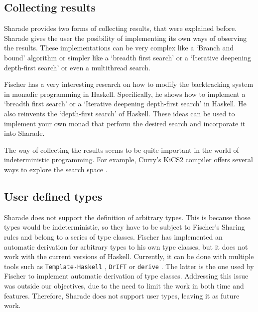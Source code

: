 \documentclass[class=article, crop=false]{standalone}
\begin{document}
\subsection{Collecting results}

Sharade provides two forms of collecting results, that were explained before. Sharade gives
the user the posibility of implementing its own ways of observing the results. These
implementations can be very complex like a `Branch and bound' algorithm or simpler like a
`breadth first search' or a `Iterative deepening depth-first search' or even a multithread
search.

Fischer has a very interesting research \cite{fischer2009reinventing} on how to modify the
backtracking system in monadic programming in Haskell. Specifically, he shows how to
implement a `breadth first search' or a `Iterative deepening depth-first search' in Haskell.
He also reinvents the `depth-first search' of Haskell. These ideas can be used to implement
your own monad that perform the desired search and incorporate it into Sharade.

The way of collecting the results seems to be quite important in the world of indeterministic
programming. For example, Curry's KiCS2 compiler offers several ways to explore the search
space \cite{hanus2012search}.

\subsection{User defined types}

Sharade does not support the definition of arbitrary types. This is because those types would
be indeterministic, so they have to be subject to Fischer's Sharing rules and belong to a
series of type classes. Fischer has implemented an automatic derivation for arbitrary types
to his own type classes, but it does not work with the current versions of Haskell.
Currently, it can be done with multiple tools such as \verb`Template-Haskell`
\cite{sheard2002template}, \verb`DrIFT` \cite{DrIFT} or \verb`derive` \cite{derive}. The
latter is the one used by Fischer to implement automatic derivation of type classes.
Addressing this issue was outside our objectives, due to the need to limit the work in both
time and features. Therefore, Sharade does not support user types, leaving it as future work.
\end{document}
